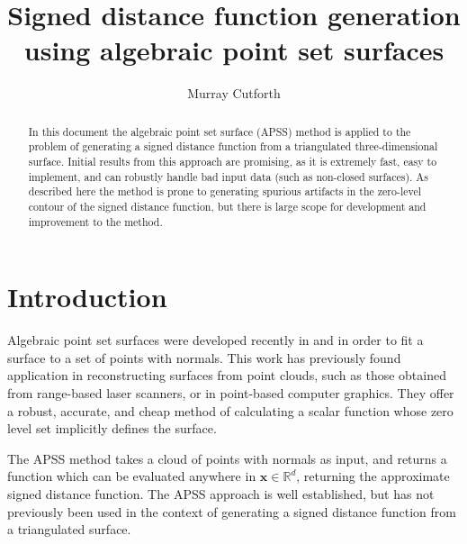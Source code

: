 \documentclass[final,3p,times,twocolumn]{elsarticle}
\begin{document}
\begin{frontmatter}



\title{Signed distance function generation using algebraic point set surfaces}


\author[cam]{Murray Cutforth}
\address[cam]{Centre for Scientific Computing, Cambridge University, Cambridge, CB3 0HE, UK}


\begin{abstract}
In this document the algebraic point set surface (APSS) method is applied to the
problem of generating a signed distance function from a triangulated three-dimensional
surface. Initial results from this approach are promising, as it is extremely fast, 
easy to implement, and
can robustly handle bad input data (such as non-closed surfaces). As described here
the method is prone to generating spurious artifacts in the zero-level contour of the
signed distance function, but there is large scope for development and improvement to
the method. 
\end{abstract}

\end{frontmatter}





\section{Introduction}
\label{intro}
Algebraic point set surfaces were developed recently in \cite{Guennebaud2007}
and \cite{Guennebaud2008}
in order to fit a surface to a set of points with normals. This work
has previously found application in reconstructing surfaces from point clouds,
such as those obtained from range-based laser scanners, or in point-based computer
graphics. They offer a robust, accurate, and cheap method of calculating a scalar 
function whose zero level set implicitly defines the surface.
\par
The APSS method takes a cloud of points with normals as input, and returns
a function which can be evaluated anywhere in $\textbf{x} \in \mathbb{R}^d$,
returning the approximate signed distance function.
The APSS approach is well established, but has not previously been 
used in the context of generating a signed
distance function from a triangulated surface.
\end{document}
